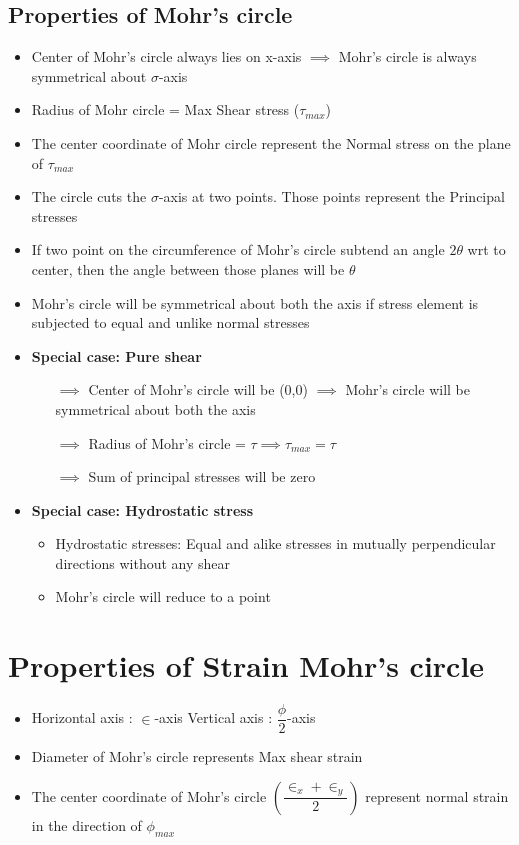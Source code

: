 \documentclass[8pt]{report}
\begin{document}
		\subsection{Properties of Mohr's circle}
			\begin{itemize}
				\item Center of Mohr's circle always lies on x-axis $\implies$ Mohr's circle is always symmetrical about $\sigma$-axis
				\item Radius of Mohr circle = Max Shear stress ($\tau_{max}$)
				\item The center coordinate of Mohr circle represent the Normal stress on the plane of $\tau_{max}$
				\item The circle cuts the $\sigma$-axis at two points. Those points represent the Principal stresses
				\item If two point on the circumference of Mohr's circle subtend an angle $2\theta$ wrt to center, then the angle between those planes will be $\theta$
				\item Mohr's circle will be symmetrical about both the axis if stress element is subjected to equal and unlike normal stresses
				\item \textbf{Special case: Pure shear} 
				\begin{itemize}
					\item[$\implies$] Center of Mohr's circle will be (0,0) $\implies$ Mohr's circle will be symmetrical about both the axis
					\item[$\implies$] Radius of Mohr's circle = $\tau \implies \tau_{max} = \tau$
					\item[$\implies$] Sum of principal stresses will be zero
				\end{itemize}
				\item \textbf{Special case: Hydrostatic stress}
					\begin{itemize}
						\item Hydrostatic stresses: Equal and alike stresses in mutually perpendicular directions without any shear
						\item Mohr's circle will reduce to a point
					\end{itemize}
			\end{itemize}\hrulefill
	\section{Properties of Strain Mohr's circle}
		\begin{itemize}
			\item Horizontal axis : $\in$-axis \hspace{1cm} Vertical axis : $\dfrac{\phi}{2}$-axis
			\item Diameter of Mohr's circle represents Max shear strain
			\item The center coordinate of Mohr's circle $\left(\dfrac{\in_x+\in_y}{2}\right)$ represent normal strain in the direction of $\phi_{max}$		
		\end{itemize}\hrulefill
\end{document}
